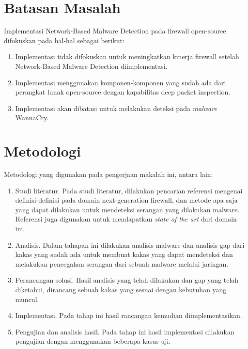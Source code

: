 \section{Batasan Masalah}
Implementasi Network-Based Malware Detection pada firewall open-source
difokuskan pada hal-hal sebagai berikut:
\begin{enumerate}
	\item Implementasi tidak difokuskan untuk meningkatkan kinerja firewall setelah Network-Based Malware Detection diimplementasi.
	\item Implementasi menggunakan komponen-komponen yang sudah ada dari perangkat lunak open-source dengan kapabilitas deep packet inspection.
	\item Implementasi akan dibatasi untuk melakukan deteksi pada \textit{malware} WannaCry.
\end{enumerate}

\section{Metodologi}
Metodologi yang digunakan pada pengerjaan makalah ini, antara lain:
\begin{enumerate}
	\item Studi literatur. Pada studi literatur, dilakukan pencarian referensi mengenai
	definisi-definisi pada domain next-generation firewall, dan metode apa saja yang dapat 
	dilakukan untuk mendeteksi serangan yang dilakukan malware. Referensi juga
	digunakan untuk mendapatkan \textit{state of the art} dari domain ini.
	\item Analisis. Dalam tahapan ini dilakukan analisis malware dan analisis gap dari
	kakas yang sudah ada untuk membuat kakas yang dapat mendeteksi dan melakukan pencegahan
	serangan dari sebuah malware melalui jaringan.
	\item Perancangan solusi. Hasil analisis yang telah dilakukan dan gap yang telah diketahui,
	dirancang sebuah kakas yang sesuai dengan kebutuhan yang muncul.
	\item Implementasi. Pada tahap ini hasil rancangan kemudian diimplementasikan.
	\item Pengujian dan analisis hasil. Pada tahap ini hasil implementasi dilakukan
	pengujian dengan menggunakan beberapa kasus uji.
\end{enumerate}
